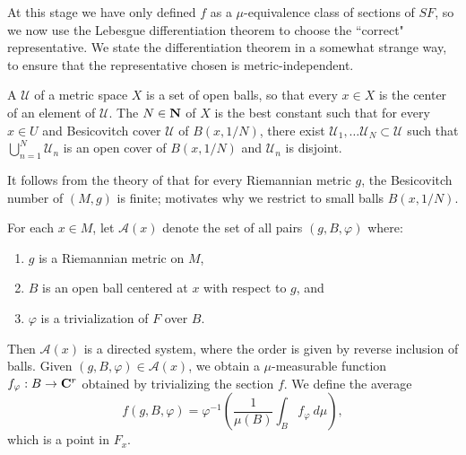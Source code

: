 At this stage we have only defined $f$ as a $\mu$-equivalence class of sections of $SF$, so we now use the Lebesgue differentiation theorem to choose the ``correct" representative.
We state the differentiation theorem in a somewhat strange way, to ensure that the representative chosen is metric-independent.

\begin{definition}
A  $\mathcal U$ of a metric space $X$ is a set of open balls, so that every $x \in X$ is the center of an element of $\mathcal U$.
The  $N \in \mathbf{N}$ of $X$ is the best constant such that for every $x \in U$ and Besicovitch cover $\mathcal U$ of $B(x, 1/N)$, there exist $\mathcal U_1, \dots \mathcal U_N \subset \mathcal U$ such that $\bigcup_{n=1}^N \mathcal U_n$ is an open cover of $B(x, 1/N)$ and $\mathcal U_n$ is disjoint.
\end{definition}

It follows from the theory of \cite[\S2.8]{federer2014geometric} that for every Riemannian metric $g$, the Besicovitch number of $(M, g)$ is finite; \cite{Shi91} motivates why we restrict to small balls $B(x, 1/N)$.

For each $x \in M$, let $\mathcal A(x)$ denote the set of all pairs $(g, B, \varphi)$ where:
\begin{enumerate}
\item $g$ is a Riemannian metric on $M$,
\item $B$ is an open ball centered at $x$ with respect to $g$, and
\item $\varphi$ is a trivialization of $F$ over $B$.
\end{enumerate}
Then $\mathcal A(x)$ is a directed system, where the order is given by reverse inclusion of balls.
Given $(g, B, \varphi) \in \mathcal A(x)$, we obtain a $\mu$-measurable function $f_\varphi: B \to \mathbf{C}^r$ obtained by trivializing the section $f$.
We define the average
\begin{equation}\label{average in a vector bundle}
f(g, B, \varphi) = \varphi^{-1}\left(\frac{1}{\mu(B)} \int_B f_\varphi ~d\mu\right),
\end{equation}
which is a point in $F_x$.

